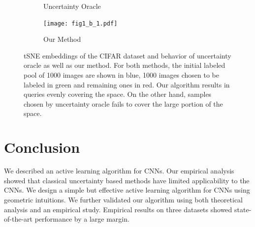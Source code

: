 \documentclass{article} %
\begin{document}
\begin{figure}
\begin{center}
\begin{subfigure}[b]{0.23\textwidth}
		\vspace{-7mm}
		\caption{Uncertainty Oracle}
    \end{subfigure}
    \begin{subfigure}[b]{0.23\textwidth}
		\texttt{[image: fig1\_b\_1.pdf]}
		\vspace{-7mm}
		\caption{Our Method}
    \end{subfigure}
\end{center}
\vspace{-3mm}
 \caption{tSNE embeddings of the CIFAR dataset and behavior of uncertainty oracle as well as our method. For both methods, the initial labeled pool of 1000 images are shown in blue, 1000 images chosen to be labeled in green and remaining ones in red. Our algorithm results in queries evenly covering the space. On the other hand, samples chosen by uncertainty oracle fails to cover the large portion of the space.}
\end{figure}


\section{Conclusion} We described an active learning algorithm for CNNs. Our empirical analysis showed that classical
uncertainty based methods have limited applicability to the CNNs. We design a simple but effective active learning
algorithm for CNNs using geometric intuitions. We further validated our algorithm using both theoretical analysis and an
empirical study. Empirical results on three datasets showed state-of-the-art performance by a large margin.




\end{document}
